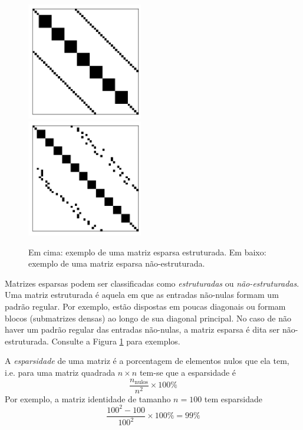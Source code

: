 \begin{figure}[H]
  \centering
  \includegraphics[width=0.45\textwidth]{./cap_sislin/dados/matriz_esparsa_estruturada/main}\\
  \includegraphics[width=0.45\textwidth]{./cap_sislin/dados/matriz_esparsa_nao_estruturada/main}
  \caption{Em cima: exemplo de uma matriz esparsa estruturada. Em baixo: exemplo de uma matriz esparsa não-estruturada.}
  \label{fig:ex_matriz_esparsa_estrutura}
\end{figure}

Matrizes esparsas podem ser classificadas como \emph{estruturadas} ou \emph{não-estruturadas}. Uma matriz estruturada é aquela em que as entradas não-nulas formam um padrão regular. Por exemplo, estão dispostas em poucas diagonais ou formam blocos (submatrizes densas) ao longo de sua diagonal principal. No caso de não haver um padrão regular das entradas não-nulas, a matriz esparsa é dita ser não-estruturada. Consulte a Figura \ref{fig:ex_matriz_esparsa_estrutura} para exemplos.

A \emph{esparsidade} de uma matriz é a porcentagem de elementos nulos que ela tem, i.e. para uma matriz quadrada $n\times n$ tem-se que a esparsidade é
\begin{equation}
  \frac{n_{\text{nulos}}}{n^2}\times 100\%
\end{equation}
Por exemplo, a matriz identidade de tamanho $n=100$ tem esparsidade
\begin{equation}
  \frac{100^2 - 100}{100^2}\times 100\% = 99\% 
\end{equation}


